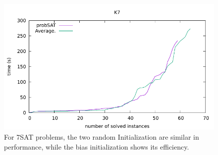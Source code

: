 \documentclass[12pt,a4paper,twoside]{scrartcl}
\numberwithin{equation}{section}
\begin{document}
  \begin{figure}[H]
\begin{center}
  \includegraphics[scale = 1]{DATA/K7/e4a.pdf}
  \end{center}
  \caption{For 7SAT problems, the two random Initialization are similar in performance, while the bias initialization shows its efficiency.}
  \label{Experiment 7 k7 cactus plot}
  \end{figure}
\end{document}
